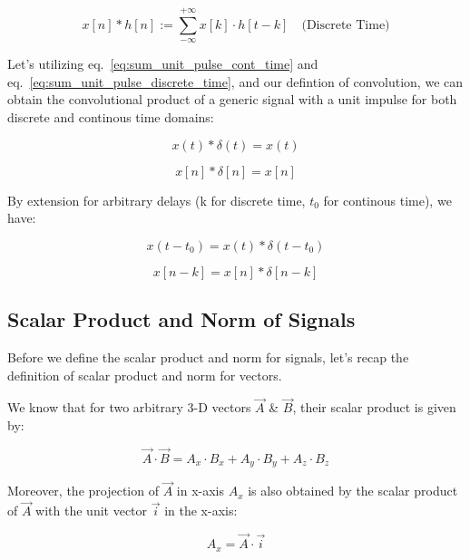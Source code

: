 \documentclass[letterpaper,12pt]{article}
\begin{document}
\begin{equation}
    x[n] * h[n] := \sum_{-\infty}^{+\infty} x[k] \cdot h[t-k] \quad \text{(Discrete Time)}
    \label{eq:convolution_discrete_time}
\end{equation}

Let's utilizing eq.~\ref{eq:sum_unit_pulse_cont_time} and eq.~\ref{eq:sum_unit_pulse_discrete_time}, and our defintion of convolution, we can obtain the convolutional product of a generic signal with a unit impulse for both discrete and continous time domains:

\begin{equation}
    x(t) * \delta(t) = x(t)
    \label{eq:convolution_unit_impulse_cont_time}
\end{equation}

\begin{equation}
    x[n] * \delta[n] = x[n]
    \label{eq:convolution_unit_impulse_discrete_time}
\end{equation}

By extension for arbitrary delays (k for discrete time, $t_{0}$ for continous time), we have:

\begin{equation}
    x(t - t_{0}) = x(t) * \delta(t - t_{0})
    \label{eq:convolution_unit_impulse_cont_time_delayed}
\end{equation}

\begin{equation}
    x[n - k] = x[n] * \delta[n - k]
    \label{eq:convolution_unit_impulse_discrete_time_delayed}
\end{equation}

\subsection*{Scalar Product and Norm of Signals}

Before we define the scalar product and norm for signals, let's recap the definition of scalar product and norm for vectors.

We know that for two arbitrary 3-D vectors $\Vec{A}$ \& $\Vec{B}$, their scalar product is given by:

\[\Vec{A} \cdot \Vec{B} = A_{x}\cdot B_{x} + A_{y}\cdot B_{y} + A_{z}\cdot B_{z}\]

Moreover, the projection of $\Vec{A}$ in x-axis $A_{x}$ is also obtained by the scalar product of $\Vec{A}$ with the unit vector $\Vec{i}$ in the x-axis:

\[A_{x} = \Vec{A}\cdot \Vec{i}\]
\end{document}
